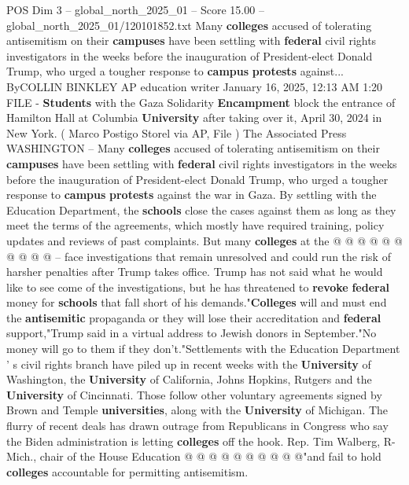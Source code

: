 \begin{textsample}{POS Dim 3 – global\_north\_2025\_01 – Score 15.00 – global\_north\_2025\_01/120101852.txt}  \label{ex:f3_pos_246}
Many \textbf{colleges} accused of tolerating antisemitism on their \textbf{campuses} have been settling with \textbf{federal} civil rights investigators in the weeks before the inauguration of President-elect Donald Trump, who urged a tougher response to \textbf{campus} \textbf{protests} against...
ByCOLLIN BINKLEY AP education writer January 16, 2025, 12:13 AM 1:20 FILE - \textbf{Students} with the Gaza Solidarity \textbf{Encampment} block the entrance of Hamilton Hall at Columbia \textbf{University} after taking over it, April 30, 2024 in New York. ( Marco Postigo Storel via AP, File ) The Associated Press WASHINGTON -- Many \textbf{colleges} accused of tolerating antisemitism on their \textbf{campuses} have been settling with \textbf{federal} civil rights investigators in the weeks before the inauguration of President-elect Donald Trump, who urged a tougher response to \textbf{campus} \textbf{protests} against the war in Gaza.
By settling with the Education Department, the \textbf{schools} close the cases against them as long as they meet the terms of the agreements, which mostly have required training, policy updates and reviews of past complaints.
But many \textbf{colleges} at the @ @ @ @ @ @ @ @ @ @ -- face investigations that remain unresolved and could run the risk of harsher penalties after Trump takes office.
Trump has not said what he would like to see come of the investigations, but he has threatened to \textbf{revoke} \textbf{federal} money for \textbf{schools} that fall short of his demands."\textbf{Colleges} will and must end the \textbf{antisemitic} propaganda or they will lose their accreditation and \textbf{federal} support,"Trump said in a virtual address to Jewish donors in September."No money will go to them if they don't."Settlements with the Education Department ' s civil rights branch have piled up in recent weeks with the \textbf{University} of Washington, the \textbf{University} of California, Johns Hopkins, Rutgers and the \textbf{University} of Cincinnati.
Those follow other voluntary agreements signed by Brown and Temple \textbf{universities}, along with the \textbf{University} of Michigan.
The flurry of recent deals has drawn outrage from Republicans in Congress who say the Biden administration is letting \textbf{colleges} off the hook.
Rep.
Tim Walberg, R-Mich., chair of the House Education @ @ @ @ @ @ @ @ @ @"and fail to hold \textbf{colleges} accountable for permitting antisemitism.

\end{textsample}
